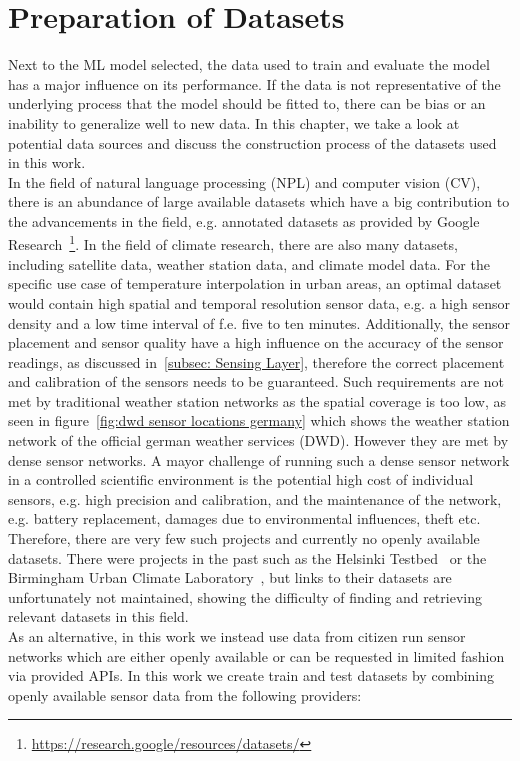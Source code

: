 \chapter{Preparation of Datasets}
\label{chap:preparations data sets}

Next to the ML model selected, the data used to train and evaluate the model has a major influence on its performance. If the data is not representative of the underlying process that the model should be fitted to, there can be bias or an inability to generalize well to new data. In this chapter, we take a look at potential data sources and discuss the construction process of the datasets used in this work.\\
In the field of natural language processing (NPL) and computer vision (CV), there is an abundance of large available datasets which have a big contribution to the advancements in the field, e.g. annotated datasets as provided by Google Research~\footnote{\url{https://research.google/resources/datasets/}}. In the field of climate research, there are also many datasets, including satellite data, weather station data, and climate model data. For the specific use case of temperature interpolation in urban areas, an optimal dataset would contain high spatial and temporal resolution sensor data, e.g. a high sensor density and a low time interval of f.e. five to ten minutes. Additionally, the sensor placement and sensor quality have a high influence on the accuracy of the sensor readings, as discussed in~\ref{subsec: Sensing Layer}, therefore the correct placement and calibration of the sensors needs to be guaranteed. Such requirements are not met by traditional weather station networks as the spatial coverage is too low, as seen in figure~\ref{fig:dwd sensor locations germany} which shows the weather station network of the official german weather services (DWD).
However they are met by dense sensor networks. A mayor challenge of running such a dense sensor network in a controlled scientific environment is the potential high cost of individual sensors, e.g. high precision and calibration, and the maintenance of the network, e.g. battery replacement, damages due to environmental influences, theft etc. Therefore, there are very few such projects and currently no openly available datasets. There were projects in the past such as the Helsinki Testbed~\cite{koskinen2011helsinki} or the Birmingham Urban Climate Laboratory~\cite{warren2016birmingham}, but links to their datasets are unfortunately not maintained, showing the difficulty of finding and retrieving relevant datasets in this field.\\
As an alternative, in this work we instead use data from citizen run sensor networks which are either openly available or can be requested in limited fashion via provided APIs. In this work we create train and test datasets by combining openly available sensor data from the following providers:

